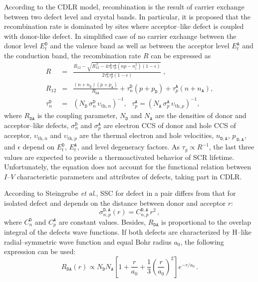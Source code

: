 \documentclass[aip,jap, amsmath,amssymb,reprint]{revtex4-1}
\begin{document}
According to the CDLR model, recombination is the result of carrier exchange between two defect level and crystal bands.
In particular, it is proposed \cite{CDLR:JAP} that the recombination rate is dominated by sites where acceptor--like defect is coupled with donor-like defect.
In simplified case of
no carrier exchange between the donor level $E_t^{\mathtt{D}}$ and the valence band
as well as between the acceptor level $E_t^{\mathtt{A}}$ and the conduction band,
the recombination rate $R$ can be expressed\cite{CDLR:JAP1995} as
\begin{eqnarray}
R&=&\frac{R_{12}-\sqrt{R_{12}^{\,2}-4\tau_{n}^{\mathtt{D}}\tau_{p}^{\mathtt{A}}(np-n_i^2)(1-\epsilon)}}{2\tau_{n}^{\mathtt{D}}\tau_{p}^{\mathtt{A}}(1-\epsilon)}\;,\label{eqR}\\
R_{12}&=&\frac{(n+n_{\mathtt{D}})(p+p_{\mathtt{A}})}{R_{\mathtt{DA}}}+
\tau_{n}^{\mathtt{D}}(p+p_{\mathtt{D}})+\tau_{p}^{\mathtt{A}}(n+n_{\mathtt{A}}),\label{eqR12}\\
\tau_{n}^{\mathtt{D}}&=&(N_{\mathtt{D}}\,\sigma_{n}^{\mathtt{D}}\,\upsilon_{\mathrm{th},n})^{-1},\,\,\,\,
\tau_{p}^{\mathtt{A}}=(N_{\mathtt{A}}\,\sigma_{p}^{\mathtt{A}}\,\upsilon_{\mathrm{th},p})^{-1},\label{eqTAU}
\end{eqnarray}
where
$R_{\mathtt{DA}}$ is the coupling parameter,
$N_{\mathtt{D}}$ and $N_{\mathtt{A}}$ are the densities of donor and acceptor--like defects,
$\sigma_{n}^{\mathtt{D}}$ and $\sigma_{p}^{\mathtt{A}}$ are electron CCS of donor and hole CCS of acceptor,
$\upsilon_{\mathrm{th},n}$ and $\upsilon_{\mathrm{th},p}$ are the thermal electron and hole velocities,
$n_{\mathtt{D,A}}$, $p_{\,\mathtt{D,A}}$, and $\epsilon$ depend on $E_t^{\mathtt{D}}$, $E_t^{\mathtt{A}}$, and level degeneracy  factors.
As $\tau_g\propto R^{-1}$, the last three values are expected to provide a thermoactivated behavior of SCR lifetime.
Unfortunately, the equation does not account for the functional relation between $I$--$V$ characteristic parameters and attributes of defects, taking part in CDLR.

According to Steingrube \emph{et al}.\cite{CDLR:JAP},
SSC for defect in a pair differs from that for isolated defect and depends on the distance between donor and acceptor $r$:
\begin{equation}
\label{eqSigma}
\sigma_{n,p}^{\mathtt{D,A}}(r)=C_{n,p}^{\mathtt{D,A}}\,r^2\,,
\end{equation}
where $C_{n}^{\mathtt{D}}$ and $C_{p}^{\mathtt{A}}$ are constant values.
Besides, $R_{\mathtt{DA}}$ is proportional to the overlap integral of the defects wave functions.
If both defects are characterized by H--like radial--symmetric wave function and equal Bohr radius $a_0$,
the following expression can be used: \cite{CDLR:JAP}
\begin{equation}
\label{eqRda}
R_{\mathtt{DA}} (r) \propto N_{\mathtt{D}}N_{\mathtt{A}}\left[1+\frac{r}{a_0}+\frac{1}{3}\left(\frac{r}{a_0}\right)^2\right]
   e^{-r/a_0}\,.
\end{equation}
\end{document}
